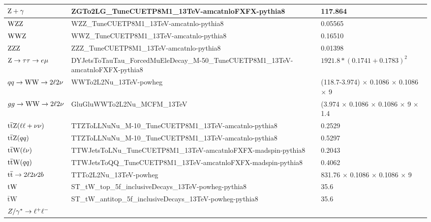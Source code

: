 \begin{table}
\begin{center}
{\begin{tabular}{|p{3.0cm}|p{13cm}|p{3.5cm}|}
       $\mathrm{Z}+\gamma$                      & ZGTo2LG\_TuneCUETP8M1\_13TeV-amcatnloFXFX-pythia8 &  117.864 \\
       \hline 
       $\mathrm{W}\mathrm{Z}\mathrm{Z}$                         & WZZ\_TuneCUETP8M1\_13TeV-amcatnlo-pythia8 & 0.05565 \\ 
       $\mathrm{W}\mathrm{W}\mathrm{Z}$                         & WWZ\_TuneCUETP8M1\_13TeV-amcatnlo-pythia8 & 0.16510 \\ 
       $\mathrm{Z}\mathrm{Z}\mathrm{Z}$                         & ZZZ\_TuneCUETP8M1\_13TeV-amcatnlo-pythia8 & 0.01398 \\ 
       \hline 
       $\mathrm{Z} \to \tau\tau \to e\mu$       & DYJetsToTauTau\_ForcedMuEleDecay\_M-50\_TuneCUETP8M1\_13TeV-amcatnloFXFX-pythia8 & $1921.8 * (0.1741 + 0.1783)^2$ \\
       $qq \to \mathrm{W}\mathrm{W}\to 2\ell 2\nu$      & WWTo2L2Nu\_13TeV-powheg & (118.7-3.974) $\times$ 0.1086 $\times$ 0.1086 $\times$ 9 \\ 
       $gg \to \mathrm{W}\mathrm{W}\to 2\ell 2\nu$      & GluGluWWTo2L2Nu\_MCFM\_13TeV & (3.974 $\times$ 0.1086 $\times$ 0.1086 $\times$ 9 $\times$ 1.4 \\ 
       ${\mathrm{t}\overline{\mathrm{t}}}\mathrm{Z}(\ell\ell+\nu\nu)$      & TTZToLLNuNu\_M-10\_TuneCUETP8M1\_13TeV-amcatnlo-pythia8 & 0.2529 \\ 
       ${\mathrm{t}\overline{\mathrm{t}}}\mathrm{Z}(qq)$                   & TTZToLLNuNu\_M-10\_TuneCUETP8M1\_13TeV-amcatnlo-pythia8 & 0.5297 \\ 
       ${\mathrm{t}\overline{\mathrm{t}}}\mathrm{W}(\ell\nu)$              & TTWJetsToLNu\_TuneCUETP8M1\_13TeV-amcatnloFXFX-madspin-pythia8 & 0.2043 \\ 
       ${\mathrm{t}\overline{\mathrm{t}}}\mathrm{W}(qq)$                   & TTWJetsToQQ\_TuneCUETP8M1\_13TeV-amcatnloFXFX-madspin-pythia8 & 0.4062 \\ 
       ${\mathrm{t}\overline{\mathrm{t}}} \to 2\ell 2\nu 2b$       & TTTo2L2Nu\_13TeV-powheg & 831.76 $\times$ 0.1086 $\times$ 0.1086 $\times$ 9 \\ 
       $\mathrm{tW}$                            & ST\_tW\_top\_5f\_inclusiveDecays\_13TeV-powheg-pythia8 & 35.6 \\ 
       $\ensuremath{\bar{\mathrm{t}}\mathrm{W}}$          & ST\_tW\_antitop\_5f\_inclusiveDecays\_13TeV-powheg-pythia8 & 35.6 \\ 
       \hline 
       \multirow{9}{*}{$Z/\gamma^*\to\ell^+\ell^-$}

\end{tabular}}
\end{center}
\end{table}
